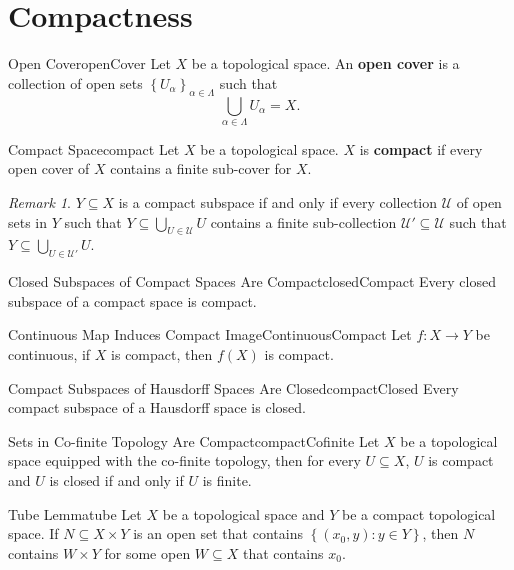\documentclass[math]{amznotes}
\theoremstyle{remark}
\newtheorem*{remark}{Remark}
\begin{document}
\section{Compactness}
\begin{dfnbox}{Open Cover}{openCover}
    Let $X$ be a topological space. An {\color{red} \textbf{open cover}} is a collection of open sets $\left\{U_{\alpha}\right\}_{\alpha \in \Lambda}$ such that 
    \begin{equation*}
        \bigcup_{\alpha \in \Lambda}U_{\alpha} = X.
    \end{equation*}
\end{dfnbox}
\begin{dfnbox}{Compact Space}{compact}
    Let $X$ be a topological space. $X$ is {\color{red} \textbf{compact}} if every open cover of $X$ contains a finite sub-cover for $X$.
\end{dfnbox}
\begin{notebox}
    \begin{remark}
        $Y \subseteq X$ is a compact subspace if and only if every collection $\mathcal{U}$ of open sets in $Y$ such that $Y \subseteq \bigcup_{U \in \mathcal{U}}U$ contains a finite sub-collection $\mathcal{U}' \subseteq \mathcal{U}$ such that $Y \subseteq \bigcup_{U \in \mathcal{U}'}U$.
    \end{remark}
\end{notebox}
\begin{probox}{Closed Subspaces of Compact Spaces Are Compact}{closedCompact}
    Every closed subspace of a compact space is compact.
\end{probox}
\begin{probox}{Continuous Map Induces Compact Image}{ContinuousCompact}
    Let $f \colon X \to Y$ be continuous, if $X$ is compact, then $f\left(X\right)$ is compact.
\end{probox}
\begin{probox}{Compact Subspaces of Hausdorff Spaces Are Closed}{compactClosed}
    Every compact subspace of a Hausdorff space is closed.
\end{probox}
\begin{probox}{Sets in Co-finite Topology Are Compact}{compactCofinite}
    Let $X$ be a topological space equipped with the co-finite topology, then for every $U \subseteq X$, $U$ is compact and $U$ is closed if and only if $U$ is finite.
\end{probox}
\begin{lembox}{Tube Lemma}{tube}
    Let $X$ be a topological space and $Y$ be a compact topological space. If $N \subseteq X \times Y$ is an open set that contains $\left\{\left(x_0, y\right) \colon y \in Y \right\}$, then $N$ contains $W \times Y$ for some open $W \subseteq X$ that contains $x_0$.
\end{lembox}
\end{document}
